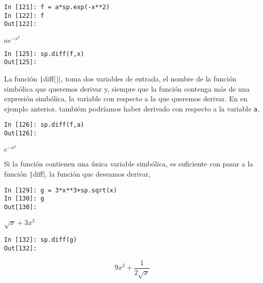 \begin{center}
	\begin{minipage}{.5\textwidth}
		\begin{verbatim}
In [121]: f = a*sp.exp(-x**2)
In [122]: f
Out[122]:
		\end{verbatim}
$ae^{-x^2}$
		\begin{verbatim}
In [125]: sp.diff(f,x)
Out[125]: 
\end{verbatim}
	\end{minipage}
\end{center}

\begin{paracol}{2}
La función \texttt|diff()|, toma dos variables de entrada, el nombre de la función simbólica que queremos derivar y, siempre que la función contenga más de una expresión simbólica, la variable con respecto a la que queremos derivar. En en ejemplo anterior, tambiém podríamos haber derivado con respecto a la variable \texttt{a},
\end{paracol}

\begin{center}
	\begin{minipage}{.5\textwidth}
		\begin{verbatim}
In [126]: sp.diff(f,a)
Out[126]: 
		\end{verbatim}
		$e^{-x^2}$
	\end{minipage}
\end{center}

\begin{paracol}{2}
Si la función contienen una única variable simbólica, es suficiente con pasar a la función \texttt|diff|, la función que deseamos derivar,
\end{paracol}

\begin{center}
	\begin{minipage}{.5\textwidth}
		\begin{verbatim}
In [129]: g = 3*x**3+sp.sqrt(x)
In [130]: g
Out[130]: 
		\end{verbatim}
		$\sqrt{x}+3x^3$
		\begin{verbatim}
In [132]: sp.diff(g)
Out[132]: 
		\end{verbatim}
		\begin{equation*}
			9x^2+\frac{1}{2\sqrt{x}}
		\end{equation*}
	\end{minipage}
\end{center}

